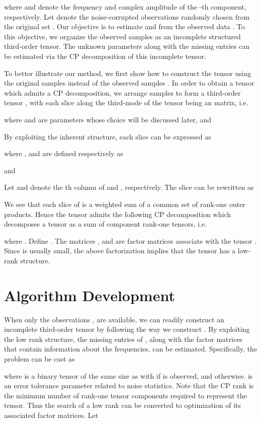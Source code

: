 \documentclass[10pt,journal,epsfig]{IEEEtran}
\begin{document}
where  and  denote the frequency and
complex amplitude of the -th component, respectively. Let
 denote the noise-corrupted
observations randomly chosen from the original set . Our
objective is to estimate  and  from the
observed data . To this objective, we organize the
observed samples  as an incomplete structured
third-order tensor. The unknown parameters  along
with the missing entries can be estimated via the CP decomposition
of this incomplete tensor.

To better illustrate our method, we first show how to construct
the tensor using the original samples  instead of the
observed samples . In order to obtain a tensor which
admits a CP decomposition, we arrange samples  to form a
third-order tensor
, with each slice along the third-mode of the tensor being an
 matrix, i.e.

where  and  are parameters whose choice will be discussed
later, and

By exploiting the inherent structure, each slice
 can be expressed as

where ,
 and
 are defined
respectively as


and

Let  and  denote the th
column of  and , respectively. The
slice  can be rewritten as

We see that each slice of  is a weighted
sum of a common set of rank-one outer products. Hence the tensor
 admits the following CP decomposition
which decomposes a tensor as a sum of component rank-one tensors,
i.e.

where . Define .
The matrices ,  and
 are factor matrices associate with the tensor
. Since  is usually small, the above
factorization implies that the tensor 
has a low-rank structure.



\section{Algorithm Development}
When only the observations , are available, we can
readily construct an incomplete third-order tensor
 by following the way we construct
. By exploiting the low rank structure,
the missing entries of , along with the
factor matrices that contain information about the frequencies,
can be estimated. Specifically, the problem can be cast as

where  is a binary tensor of the same
size as  with  if
 is observed, and 
otherwise.  is an error tolerance parameter related
to noise statistics. Note that the CP rank is the minimum number
of rank-one tensor components required to represent the tensor.
Thus the search of a low rank  can be
converted to optimization of its associated factor matrices. Let
\end{document}
